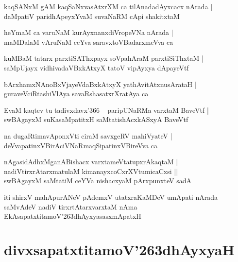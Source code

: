 \documentclass[twoside,12pt,openright]{book}
\def\S{\char'263}
\newcounter{shloka}[chapter]
\begin{document}
\begin{shloka}%
kaqSANxM gAM kaqSaNxvasAtxrXM ca tilAnadadAyxcacx nArada |\\
daMpatiV paridhApeyxYvaM suvaNaRM cApi shakitxtaM 
\end{shloka}

\begin{shloka}%
heYmaM ca varuNaM kurAyxnanxdiVropeVNa nArada |\\
maMDalaM vAruNaM ceYva saravxtoVBadarxmeVva ca 
\end{shloka}

\begin{shloka}%
kuMBaM tatarx parxtiSAThxpayx soVpahAraM parxtiSiThxtaM |\\
saMpUjayx vidhivadaVBxkAtxyX tatoV vipAyxya dApayeVtf
\end{shloka}

\begin{shloka}%
bArxhamxNAnoBxVjayeVdaBxkAtxyX yathAvitAtxnusArataH |\\
guraveVciRtashiVlAya savaRshasatxrXratAya ca 
\end{shloka}

\begin{shloka}%
EvaM kaqtev tu tadivxdavx\char'366 ~ paripUNaRMa varxtaM BaveVtf |\\
swBAgayxM suKasaMpatitxH saMtatishAcxkASxyA BaveVtf
\end{shloka}

\begin{shloka}%
na dugaRtimavAponxVti ciraM savxgeRV mahiVyateV |\\
deVvapatinxVBirAciVNaRmaqSipatinxVBireVva ca 
\end{shloka}

\begin{shloka}%
nAgasidAdhxMganABishacx varxtameVtatupxrAkaqtaM |\\
nadiVtirxrAtarxmatulaM kimanayxcoCxrXVtumicaCxsi ||\\
swBAgayxM saMtatiM ceYVa nishacxyaM pArxpunxteV sadA
\end{shloka}

\begin{center}
iti shirxV mahApurANeV pAdemxV utatxraKaMDeV umApati nArada saMvAdeV nadiV tirxrtAtarxvarxtaM nAma 
EkAsapatxtitamoV\S dhAyxyasasxmApatxH
\end{center}

\chapter{divxsapatxtitamoV\S dhAyxyaH}
\end{document}
